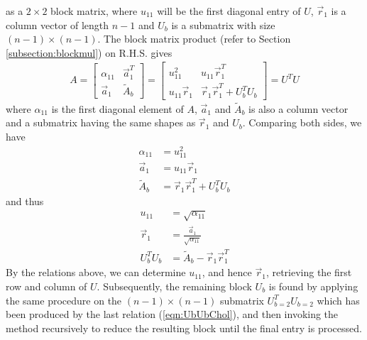 as a $2 \times 2$ block matrix, where $u_{11}$ will be the first diagonal entry of $U$, $\vec{r}_1$ is a column vector of length $n-1$ and $U_b$ is a submatrix with size $(n-1) \times (n-1)$. The block matrix product (refer to Section \ref{subsection:blockmul}) on R.H.S. gives
\begin{align}
A = 
\begin{bmatrix}
\alpha_{11} & \vec{a}_1^T \\
\vec{a}_1 & \tilde{A}_b 
\end{bmatrix}
=
\begin{bmatrix}
u_{11}^2 & u_{11}\vec{r}_1^T \\
u_{11}\vec{r}_1 & \vec{r}_1\vec{r}_1^T + U_b^T U_b
\end{bmatrix}
= U^TU
\end{align}
where $\alpha_{11}$ is the first diagonal element of $A$, $\vec{a}_1$ and $\tilde{A}_b$ is also a column vector and a submatrix having the same shapes as $\vec{r}_1$ and $U_b$. Comparing both sides, we have
\begin{subequations}
\begin{align}
\alpha_{11} &= u_{11}^2 \\
\vec{a}_1 &= u_{11}\vec{r}_1 \\
\tilde{A}_b &= \vec{r}_1\vec{r}_1^T + U_b^T U_b
\end{align}    
\end{subequations}
and thus
\begin{subequations}
\begin{align}
u_{11} &= \sqrt{\alpha_{11}} \\
\vec{r}_1 &= \frac{\vec{a}_1}{\sqrt{\alpha_{11}}} \\
U_b^T U_b &= \tilde{A}_b - \vec{r}_1\vec{r}_1^T \label{eqn:UbUbChol}
\end{align}
\end{subequations}
By the relations above, we can determine $u_{11}$, and hence $\vec{r}_1$, retrieving the first row and column of $U$. Subsequently, the remaining block $U_b$ is found by applying the same procedure on the $(n-1) \times (n-1)$ submatrix $U_{b=2}^T U_{b=2}$ which has been produced by the last relation (\ref{eqn:UbUbChol}), and then invoking the method recursively to reduce the resulting block until the final entry is processed.
